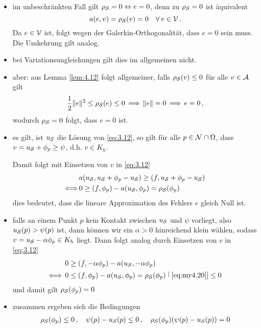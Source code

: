 \begin{itemize}
\item im unbeschränkten Fall gilt $\rho_{\mathcal S} = 0 \Leftrightarrow e = 0$, denn zu $\rho_{\mathcal S} = 0$ ist äquivalent
\[
	a(e,v) = \rho_{\mathcal S}(v) = 0 \quad \forall \, v \in \mathcal V\, .
\]
Da $e\in \mathcal V$ ist, folgt wegen der Galerkin-Orthogonalität, dass $e=0$ sein muss. Die Umkehrung gilt analog.

\item bei Variationsungleichungen gilt dies im allgemeinen nicht.

\item aber: aus Lemma \ref{lem:4.12} folgt allgemeiner, falls $\rho_{\mathcal S} (v) \le 0$ für alle $v \in \mathcal A$ gilt
\[
	\frac 12 \lVert e\rVert^2 \le \rho_{\mathcal S}(e) \le 0\,  \Longrightarrow\,  \lVert e\rVert = 0 \, \Longrightarrow\, e = 0 \, ,
\]
wodurch $\rho_{\mathcal S} = 0$ folgt, dass $e = 0$ ist.

\item es gilt, ist $u_{\mathcal S}$ die Lösung von \eqref{eq:3.12}, so gilt für alle $p \in \mathcal N \cap \Omega$, dass $v = u_{\mathcal S} + \phi_p  \ge \psi$, d.h. $v \in K_h$.

Damit folgt mit Einsetzen von $v$ in  \eqref{eq:3.12}
\begin{align}\notag
	&a(u_{\mathcal S}, u_{\mathcal S} + \phi_p - u_{\mathcal S}) \ge (f,u_{\mathcal S}+\phi_p-u_{\mathcal S}) \\
	\label{eq:my4.20}
	\Longleftrightarrow \,  & 0 \ge (f,\phi_p)-a(u_{\mathcal S},\phi_p) = \rho_{\mathcal S}(\phi_p)
\end{align}
dies bedeutet, dass die lineare Approximation des Fehlers $e$ gleich Null ist.

\item falls an einem Punkt $p$ kein Kontakt zwischen $u_{\mathcal S}$ und $\psi$ vorliegt, also $u_{\mathcal S} (p) > \psi(p)$ ist, dann können wir ein $\alpha > 0$ hinreichend klein wählen, sodass $v = u_{\mathcal S} - \alpha \phi_p \in K_h$ liegt. Dann folgt analog durch Einsetzen von $v$ in \eqref{eq:3.12}
\begin{align*}
	0 & \ge (f,-\alpha \phi_p) - a(u_{\mathcal S},-\alpha\phi_p) \\
	\Longleftrightarrow \, 0 & \le (f,\phi_p) - a(u_{\mathcal S},\phi_p) = \rho_{\mathcal S} (\phi_p) \stackrel[\scriptsize\eqref{eq:my4.20}]{}\le 0
\end{align*}
und damit gilt $\rho_{\mathcal S} (\phi_p) = 0$

\item zusammen ergeben sich die Bedingungen
\begin{align}\label{eq:4.21}
	\rho_{\mathcal S} (\phi_p) \le 0 \, , \quad \psi(p)-u_{\mathcal S} (p) \le 0 \, , \quad \rho_{\mathcal S} (\phi_p) (\psi(p)-u_{\mathcal S} (p)) = 0
\end{align}


\end{itemize}
